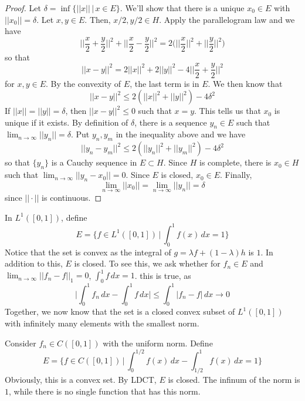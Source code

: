 \begin{proof}
Let $\delta =\inf\{||x|| \,|\, x\in E\}$. We'll show that there is a unique $x_0\in E$ with $||x_0||=\delta $. Let $x,y\in E$. Then, $x/2,y/2\in H$. Apply the parallelogram law and we have
\[\Big|\Big|\dfrac{x}{2}+\dfrac{y}{2}\Big|\Big|^2+\Big|\Big|\dfrac{x}{2}-\dfrac{y}{2}\Big|\Big|^2=2\Big(\Big|\Big|\dfrac{x}{2}\Big|\Big|^2+\Big|\Big|\dfrac{y}{2}\Big|\Big|^2\Big)\]
so that 
\[||x-y||^2=2||x||^2+2||y||^2-4\Big|\Big|\dfrac{x}{2}+\dfrac{y}{2}\Big|\Big|^2\]
for $x,y\in E$. By the convexity of $E$, the last term is in $E$. We then know that
\[||x-y||^2\leq 2(||x||^2+||y||^2)-4\delta ^2\]
If $||x||=||y||=\delta $, then $||x-y||^2\leq 0$ such that $x=y$. This tells us that $x_0$ is unique if it exists.
\newline
\newline
By definition of $\delta $, there is a sequence $y_{n}\in E$ such that $\lim _{n\rightarrow \infty }||y_{n}||=\delta $. Put $y_{n},y_{m}$ in the inequality above and we have
\[||y_{n}-y_{m}||^2\leq 2(||y_{n}||^2+||y_{m}||^2)-4\delta ^2\]
so that $\{y_{n}\}$ is a Cauchy sequence in $E\subset H$. Since $H$ is complete, there is $x_0\in H$ such that $\lim _{n\rightarrow \infty }||y_{n}-x_0||=0$. Since $E$ is closed, $x_0\in E$. Finally,
\[\lim _{n\rightarrow \infty }||x_0||=\lim _{n\rightarrow \infty }||y_{n}||=\delta \]
since $||\cdot ||$ is continuous.
\end{proof}
\vspace{2ex}
\begin{ex}
In $L^{1}([0,1])$, define
\[E=\Big\{f\in L^{1}([0,1]) \,\Big|\,\int ^{1}_{0}f(x)\,dx=1 \Big\}\]
Notice that the set is convex as the integral of $g=\lambda f+(1-\lambda )h$ is $1$. In addition to this, $E$ is closed. To see this, we ask whether for $f_{n}\in E$ and $\lim _{n\rightarrow \infty }||f_{n}-f||_{1}=0$, $\int ^{1}_{0}f\,dx=1$. this is true, as 
\[\Big|\int ^{1}_{0}f_{n}\,dx-\int ^{1}_{0}f\,dx\Big|\leq \int ^{1}_{0}|f_{n}-f|\,dx\rightarrow 0\]
Together, we now know that the set is a closed convex subset of $L^{1}([0,1])$ with infinitely many elements with the smallest norm. 
\end{ex} 
\vspace{2ex}
\begin{ex}
Consider $f_{n}\in C([0,1])$ with the uniform norm. Define
\[E=\Big\{f\in C([0,1]) \,\Big|\,\int ^{1/2}_{0}f(x)\,dx-\int ^{1}_{1/2}f(x)\,dx=1 \Big\}\]
Obviously, this is a convex set. By LDCT, $E$ is closed. The infinum of the norm is $1$, while there is no single function that has this norm. 
\end{ex}
